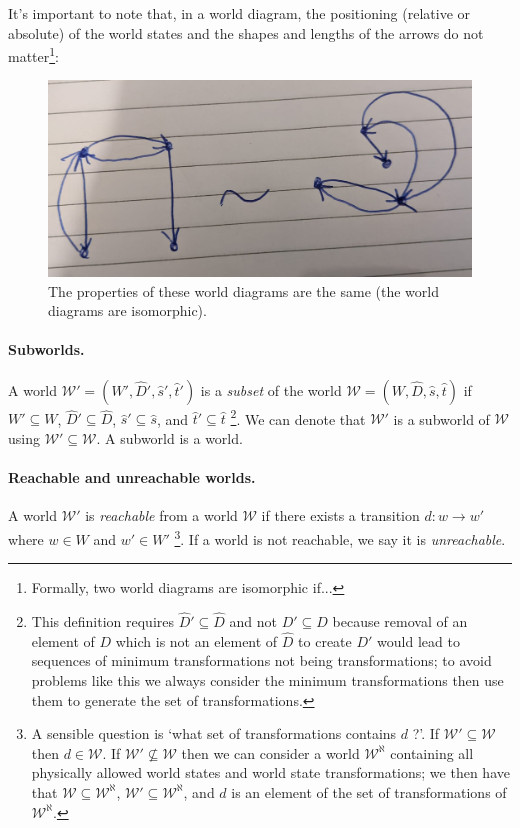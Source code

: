 It's important to note that, in a world diagram, the positioning (relative or absolute) of the world states and the shapes and lengths of the arrows do not matter\footnote{Formally, two world diagrams are isomorphic if...}:
\begin{figure}
    \centering
    \includegraphics[width=0.5\linewidth]{2MathematicalFramework/InitialFramework/Images/isomorphic_world_diagrams.jpeg}
    \caption{The properties of these world diagrams are the same (the world diagrams are isomorphic).}
    \label{fig:isomorphic_world_diagrams}
\end{figure}

\paragraph{Subworlds.}
A world $\mathscr{W}' = (W', \hat{D}', \hat{s}', \hat{t}')$ is a \emph{subset} of the world $\mathscr{W} = (W, \hat{D}, \hat{s}, \hat{t})$ if $W' \subseteq W$, $\hat{D}' \subseteq \hat{D}$, $\hat{s}' \subseteq \hat{s}$, and $\hat{t}' \subseteq \hat{t}$ \footnote{
This definition requires $\hat{D}' \subseteq \hat{D}$ and not $D' \subseteq D$ because removal of an element of $D$ which is not an element of $\hat{D}$ to create $D'$ would lead to sequences of minimum transformations not being transformations; to avoid problems like this we always consider the minimum transformations then use them to generate the set of transformations.
}.
We can denote that $\mathscr{W}'$ is a subworld of $\mathscr{W}$ using $\mathscr{W}' \subseteq \mathscr{W}$.
A subworld is a world.

\paragraph{Reachable and unreachable worlds.}
A world $\mathscr{W}'$ is \emph{reachable} from a world $\mathscr{W}$ if there exists a transition $d: w \to w'$ where $w \in W$ and $w' \in W'$ 
\footnote{
A sensible question is `what set of transformations contains $d$ ?'.
If $\mathscr{W}' \subseteq \mathscr{W}$ then $d \in \mathscr{W}$.
If $\mathscr{W}' \not\subseteq \mathscr{W}$ then we can consider a world $\mathscr{W}^{\aleph}$ containing all physically allowed world states and world state transformations; we then have that $\mathscr{W} \subseteq \mathscr{W}^{\aleph}$, $\mathscr{W}' \subseteq \mathscr{W}^{\aleph}$, and $d$ is an element of the set of transformations of $\mathscr{W}^{\aleph}$.
}.
If a world is not reachable, we say it is \emph{unreachable}.


